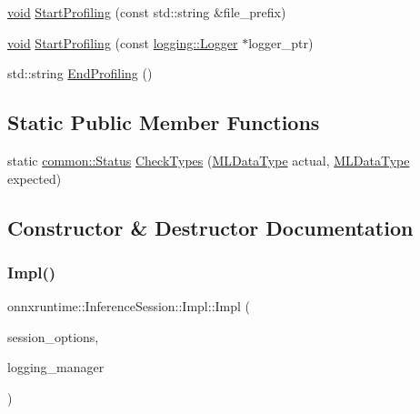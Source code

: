 \begin{DoxyCompactItemize}
\item 
\mbox{\hyperlink{mlasi_8h_a88f941d423cb2a819b70a1358982b1a6}{void}} \mbox{\hyperlink{classonnxruntime_1_1InferenceSession_1_1Impl_aa6eca602c08e2c3c76aa6fadd05b9e22}{Start\+Profiling}} (const std\+::string \&file\+\_\+prefix)
\item 
\mbox{\hyperlink{mlasi_8h_a88f941d423cb2a819b70a1358982b1a6}{void}} \mbox{\hyperlink{classonnxruntime_1_1InferenceSession_1_1Impl_a68f97798c8a5403de9648c8e08c4de88}{Start\+Profiling}} (const \mbox{\hyperlink{classonnxruntime_1_1logging_1_1Logger}{logging\+::\+Logger}} $\ast$logger\+\_\+ptr)
\item 
std\+::string \mbox{\hyperlink{classonnxruntime_1_1InferenceSession_1_1Impl_af4994d40aa3ac98a6d7542a4c18d336b}{End\+Profiling}} ()
\end{DoxyCompactItemize}
\subsection*{Static Public Member Functions}
\begin{DoxyCompactItemize}
\item 
static \mbox{\hyperlink{classonnxruntime_1_1common_1_1Status}{common\+::\+Status}} \mbox{\hyperlink{classonnxruntime_1_1InferenceSession_1_1Impl_a1ac8cdb4798aecb427ccfaf41511d8f6}{Check\+Types}} (\mbox{\hyperlink{namespaceonnxruntime_ad77d0a6e838ec7da5dc35fed5ee66b49}{M\+L\+Data\+Type}} actual, \mbox{\hyperlink{namespaceonnxruntime_ad77d0a6e838ec7da5dc35fed5ee66b49}{M\+L\+Data\+Type}} expected)
\end{DoxyCompactItemize}


\subsection{Constructor \& Destructor Documentation}
\mbox{\label{classonnxruntime_1_1InferenceSession_1_1Impl_a27d5ce43614c5f4d516d32aa1819fbe8}} 
\subsubsection{\texorpdfstring{Impl()}{Impl()}}
{\footnotesize\ttfamily onnxruntime\+::\+Inference\+Session\+::\+Impl\+::\+Impl (\begin{DoxyParamCaption}\item[{const \mbox{\hyperlink{structonnxruntime_1_1SessionOptions}{Session\+Options}} \&}]{session\+\_\+options,  }\item[{\mbox{\hyperlink{classonnxruntime_1_1logging_1_1LoggingManager}{logging\+::\+Logging\+Manager}} $\ast$}]{logging\+\_\+manager }\end{DoxyParamCaption})\hspace{0.3cm}{\ttfamily [inline]}}



